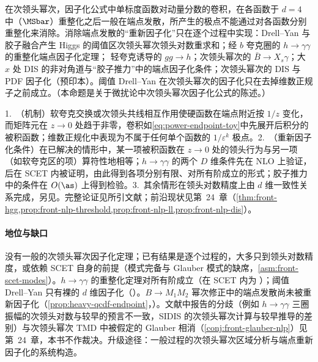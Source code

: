 \begin{proposition}\label{prop:power-nlp-endpoint}
在次领头幂次，因子化公式中单标度函数对动量分数的卷积，在各函数于 $d=4$ 中（$\MSbar$）重整化之后一般在端点发散，所产生的极点不能通过对各函数分别重整化来消除。消除端点发散的“重新因子化”只在逐个过程中实现：Drell--Yan 与胶子融合产生 Higgs 的阈值区次领头幂次领头对数重求和\cite{Beneke:2018gvs,Beneke:2019mua}；经 $b$ 夸克圈的 $h\to\gamma\gamma$ 的重整化端点因子化定理\cite{Liu:2019oav,Liu:2020wbn}；%
轻夸克诱导的 $gg\to h$\cite{Liu:2022ajh}；次领头幂次的 $\bar B\to X_s\gamma$\cite{Hurth:2023paz}；大 $x$ 处 DIS 的非对角道\cite{Beneke:2020ibj}与“胶子推力”中的端点因子化条件\cite{Beneke:2022obx}；次领头幂次的 DIS 与 PDF 因子化\cite{Beneke:2026miy}（预印本）。阈值 Drell--Yan 在次领头幂次的因子化只在去掉维数正规子之前成立\cite{Beneke:2019oqx}。（本命题是关于微扰论中次领头幂次因子化公式的陈述。）
\end{proposition}

\begin{proofsketch}
1.~（机制）软夸克交换或次领头共线相互作用使硬函数在端点附近按 $1/z$ 变化，而矩阵元在 $z\to0$ 处趋于非零，卷积如\eqref{eq:power-endpoint-toy}中先展开后积分的被积函数；维数正规化中表现为不属于任何单个函数的 $1/\varepsilon^k$ 极点\cite{Liu:2019oav,Beneke:2019oqx}。2.~（重新因子化条件）在已解决的情形中，某一项被积函数在 $z\to0$ 处的领头行为与另一项（如软夸克区的项）算符性地相等；$h\to\gamma\gamma$ 的两个 $D$ 维条件先在 NLO 上验证\cite{Liu:2019oav}，后在 SCET 内被证明\cite[第~3~节]{Liu:2020wbn}，由此得到各项分别有限、对所有阶成立的形式\cite{Liu:2020wbn}；胶子推力中的条件在 $O(\as)$ 上得到检验\cite{Beneke:2022obx}。3.~其余情形在领头对数精度上由 $d$ 维一致性关系完成\cite{Beneke:2018gvs,Beneke:2019mua,Beneke:2020ibj}，另见\cite{Hurth:2023paz,Beneke:2026miy}。完整论证见所引文献；前沿现状见第~24~章（\cref{thm:front-hgg,prop:front-nlp-threshold,prop:front-nlp-ll,prop:front-nlp-dis}）。
\end{proofsketch}

\paragraph{地位与缺口}
没有一般的次领头幂次因子化定理；已有结果是逐个过程的，大多只到领头对数精度，或依赖 SCET 自身的前提（模式完备与 Glauber 模式的缺席，\cref{asm:front-scet-modes}）。$h\to\gamma\gamma$ 的重整化定理对所有阶成立（在 SCET 内为 \tagA）；阈值 Drell--Yan 只有裸的 $d$ 维因子化（\tagP）。$B\to M_1M_2$ 幂次修正中的端点发散尚未被重新因子化（\cref{prop:heavy-qcdf-endpoint}，\tagV）。文献中报告的分歧（例如 $h\to\gamma\gamma$ 三圈振幅的次领头对数与较早的预言不一致\cite{Liu:2020wbn,Akhoury:2001mz}，SIDIS 的次领头幂次计算与较早推导的差别\cite{Rodini:2023plb}）与次领头幂次 TMD 中被假定的 Glauber 相消（\cref{conj:front-glauber-nlp}）见第~24~章，本书不作裁决。升级途径：一般过程的次领头幂次区域分析与端点重新因子化的系统构造。

